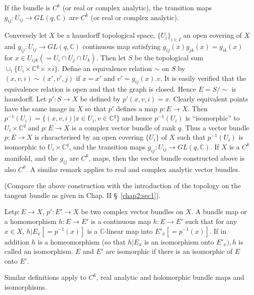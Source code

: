 If the bundle is $C^k$ (or real or complex analytic), the transition
maps $g_{ij}:U_{ij} \to GL(q, \mathbb{C})$ are $C^k$ (or real or
complex analytic). 

Conversely let $X$ be a hausdorff topological space, $\{ U_{i}\}_{i
  \in I}$ an open covering of $X$ and $g_{ij}: U_{ij} \to GL(q,
\mathbb{C})$ continuous map satisfying $g_{ij}(x)g_{jk}(x)=g_{ik}(x)$
for $x \in U_{ijk}(=U_i \cap U_j \cap U_k)$. Then let $S$ be the
topological sum $\displaystyle\mathop{\cup}_{i} \{U_i \times
\mathbb{C}^q \times \times i\}$. Define an 
equivalence relation $\sim$ on $S$ by $(x, v, i)\sim (x', v' ,j)$ if
$x=x'$ and $v'=g_{ij}(x).v$. It is easily verified that the
equivalence relation is open and that the graph is closed. Hence $E
=S/ \sim$ is hausdorff. Let $p':S \to X$ be defined by
$p'(x,v,i)=x$. Clearly equivalent points have the same image in $X$ so
that $p'$ defines a map $p:E \to X$. Then $p^{-1}(U_i)= \{ \overline
{(x,v,i)}|x \in U_i,v \in \mathbb{C}^q \}$ and hence $p^{-1}(U_i)$ is
``isomorphic'' to $U_i \times \mathbb{C}^q$ and $p: E \to X$ is a
complex vector bundle of rank $q$. Thus a vector bundle $p: E \to X$
is characterised by an open covering $\{ U_i \}$ of $X$ such that
$p^{-1}(U_i)$ is isomorphic to $U_i \times \mathbb{C}^q$, and the
transition maps $g_{ij}:U_{ij} \to GL(q, \mathbb{C})$. If $X$ is a
$C^k$ manifold, and the $g_{ij}$ are $C^k$, maps, then the vector
bundle constructed above is also $C^k$. A similar remark applies to
real and complex analytic vector bundles. 

(Compare the above construction with the introduction of the topology
on the tangent bundle as given in Chap. II \S\ \ref{chap2:sec1}). 

\begin{defi*}
  Let\pageoriginale $p:E \to X$, $p':E' \to X$ be two complex vector bundles on
  $X$. A bundle map or a homomorphism $h:E \to E'$ is a continuous
  map $h:E \to E'$ such that for any $x \in X$, $h | E_x [=p^{-1}(x)]$
  is a $\mathbb{C}$-linear map into $E'_x [=p^{-1}(x)]$. If in
  addition $h$ is a homeomorphism (so that $h|E_x$ is an isomorphism
  onto $E'_x),h$ is called an isomorphism. $E$ and $E'$ are isomorphic
  if there is an isomorphic of $E$ onto $E'$. 
\end{defi*}

Similar definitions apply to $C^k$, real analytic and holomorphic
bundle maps and isomorphisms. 


